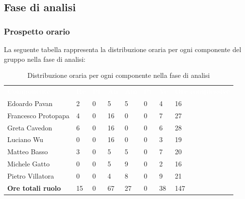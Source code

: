 \subsection{Fase di analisi}

\subsubsection{Prospetto orario}
La seguente tabella rappresenta la distribuzione oraria per ogni componente del gruppo nella fase di analisi:
\begin{table}[H]
\begin{center}
\renewcommand{\arraystretch}{1.25}
\begin{tabular}{ m{}<{\centering}  m{}<{\centering} m{}<{\centering} m{}<{\centering}  m{}<{\centering}  m{}<{\centering}  m{}<{\centering}  m{}<{\centering}   }
	\rowcolor{darkblue}
	\textcolor{white}{\textbf{Componente}} &\textcolor{white}{\textbf{Re}}&\textcolor{white}{\textbf{Pt}}&\textcolor{white}{\textbf{An}}&\textcolor{white}{\textbf{Am}}&\textcolor{white}{\textbf{Pr}}&\textcolor{white}{\textbf{Ve}}&\textcolor{white}{\textbf{Ore complessive}}\\ 
	Edoardo Pavan & 2 & 0 & 5 & 5 & 0 & 4 & 16 \\	
	
	Francesco Protopapa & 4 & 0 & 16 & 0 & 0 & 7 & 27 \\

	Greta Cavedon & 6 & 0 & 16 & 0 & 0 & 6 & 28 \\
	
	Luciano Wu & 0 & 0 & 16 & 0 & 0 & 3 & 19 \\
	
	Matteo Basso & 3 & 0 & 5 & 5 & 0 & 7 & 20 \\
	
	Michele Gatto &  0 & 0 & 5 & 9 & 0 & 2 & 16 \\
	
	Pietro Villatora & 0 & 0 & 4 & 8 & 0 & 9 & 21 \\
	
	\textbf{Ore totali ruolo} & 15 & 0 & 67 & 27 & 0 & 38 & 147\\

\end{tabular}
\caption{Distribuzione oraria per ogni componente nella fase di analisi}
\end{center}
\end{table}

